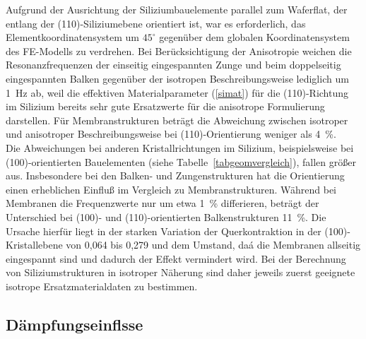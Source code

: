 Aufgrund der Ausrichtung der Siliziumbauelemente parallel
zum Waferflat, der entlang der (110)-Siliziumebene orientiert ist, war es
erforderlich, das Elementkoordinatensystem um $45^{\circ}$
gegenüber dem globalen Koordinatensystem des FE-Modells zu verdrehen.
Bei Berücksichtigung der Anisotropie weichen die Resonanzfrequenzen der
einseitig eingespannten Zunge und beim doppelseitig eingespannten Balken
gegenüber der isotropen Beschreibungsweise lediglich um 1~Hz ab, weil
die effektiven Materialparameter (\ref{simat}) für die (110)-Richtung im
Silizium bereits sehr gute Ersatzwerte für die anisotrope Formulierung
darstellen. Für Membranstrukturen beträgt die Abweichung zwischen
isotroper und anisotroper Beschreibungsweise bei (110)-Orientierung
weniger als 4~\%.\\
Die Abweichungen bei anderen Kristallrichtungen im Silizium, beispielsweise
bei (100)-orientierten Bauelementen (siehe Tabelle~\ref{tabgeomvergleich}),
fallen größer aus. Insbesondere bei den Balken- und Zungenstrukturen hat die
Orientierung einen erheblichen Einfluß im Vergleich zu Membranstrukturen.
Während bei Membranen die Frequenzwerte nur um etwa 1~\% differieren,
beträgt der Unterschied bei (100)- und (110)-orientierten Balkenstrukturen
11~\%. Die Ursache hierfür liegt in der starken Variation der
Querkontraktion in der (100)-Kristallebene von 0,064 bis 0,279 \cite{Heu89}
und dem Umstand, daá die Membranen allseitig eingespannt sind und dadurch
der Effekt vermindert wird. Bei der Berechnung von Siliziumstrukturen
in isotroper Näherung sind daher jeweils zuerst geeignete isotrope
Ersatzmaterialdaten zu bestimmen.



\subsection{Dämpfungseinflsse}
\label{daempfungseinfluesse}

